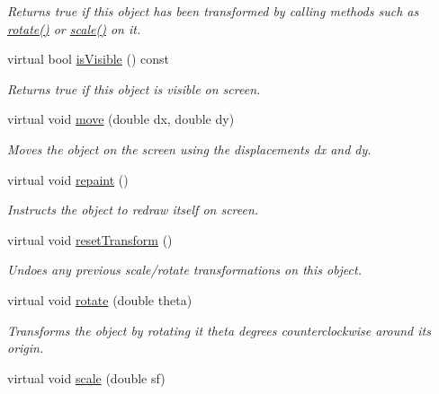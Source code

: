 \begin{DoxyCompactItemize}
\begin{DoxyCompactList}\small\item\em Returns {\ttfamily true} if this object has been transformed by calling methods such as \mbox{\hyperlink{classsgl_1_1GObject_ae1ffaa12185dfd5ba464f7d87c329e26}{rotate()}} or \mbox{\hyperlink{classsgl_1_1GObject_ad2e1900f730475c2d044817db03b38d6}{scale()}} on it. \end{DoxyCompactList}\item 
virtual bool \mbox{\hyperlink{classsgl_1_1GObject_a9d8a6cfb13917785c143e74d40e4e2be}{is\+Visible}} () const
\begin{DoxyCompactList}\small\item\em Returns {\ttfamily true} if this object is visible on screen. \end{DoxyCompactList}\item 
virtual void \mbox{\hyperlink{classsgl_1_1GObject_a5973d8dda83afb36e2c56855515be392}{move}} (double dx, double dy)
\begin{DoxyCompactList}\small\item\em Moves the object on the screen using the displacements {\ttfamily dx} and {\ttfamily dy}. \end{DoxyCompactList}\item 
virtual void \mbox{\hyperlink{classsgl_1_1GObject_ac827b978aa122f136a14c198687ad80f}{repaint}} ()
\begin{DoxyCompactList}\small\item\em Instructs the object to redraw itself on screen. \end{DoxyCompactList}\item 
virtual void \mbox{\hyperlink{classsgl_1_1GObject_a6022a1fd1e5dcd2fd5585e5a36aa3f37}{reset\+Transform}} ()
\begin{DoxyCompactList}\small\item\em Undoes any previous scale/rotate transformations on this object. \end{DoxyCompactList}\item 
virtual void \mbox{\hyperlink{classsgl_1_1GObject_ae1ffaa12185dfd5ba464f7d87c329e26}{rotate}} (double theta)
\begin{DoxyCompactList}\small\item\em Transforms the object by rotating it {\ttfamily theta} degrees counterclockwise around its origin. \end{DoxyCompactList}\item 
virtual void \mbox{\hyperlink{classsgl_1_1GObject_ad2e1900f730475c2d044817db03b38d6}{scale}} (double sf)

\end{DoxyCompactItemize}

